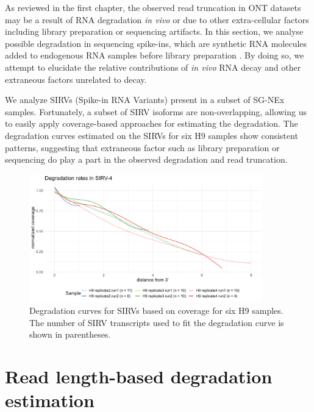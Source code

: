 As reviewed in the first chapter, the observed read truncation in ONT datasets may be a result of RNA degradation \textit{in vivo} or due to other extra-cellular factors including library preparation or sequencing artifacts. In this section, we analyse possible degradation in sequencing spike-ins, which are synthetic RNA molecules added to endogenous RNA samples before library preparation \cite{Lexogen20201}. By doing so, we attempt to elucidate the relative contributions of \textit{in vivo} RNA decay and other extraneous factors unrelated to decay.

We analyze SIRVs (Spike-in RNA Variants) present in a subset of SG-NEx samples. Fortunately, a subset of SIRV isoforms are non-overlapping, allowing us to easily apply coverage-based approaches for estimating the degradation. The degradation curves estimated on the SIRVs for six H9 samples show consistent patterns, suggesting that extraneous factor such as library preparation or sequencing do play a part in the observed degradation and read truncation.    

\begin{figure}[H]
    \centering
    \includegraphics[width=0.9\textwidth]{figures/sec-2-cov-spike.png}
    \caption[Degradation curves for SIRVs based on coverage]{Degradation curves for SIRVs based on coverage for six H9 samples. The number of SIRV transcripts used to fit the degradation curve is shown in parentheses.}
    \label{fig:cov-spike}
\end{figure}


\section{Read length-based degradation estimation}\label{sec:rld}

